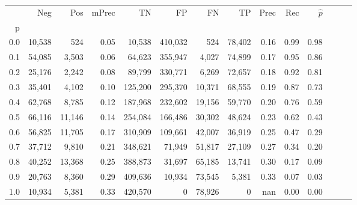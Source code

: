 \begin{tabular}{rrrrrrrrrrrrrr}
\toprule
{} &     Neg &     Pos & mPrec &       TN &       FP &      FN &      TP &  Prec &   Rec & $\hat{p}$ \\
p   &         &         &       &          &          &         &         &       &       &           \\
\midrule
0.0 &  10,538 &     524 &  0.05 &   10,538 &  410,032 &     524 &  78,402 &  0.16 &  0.99 &      0.98 \\
0.1 &  54,085 &   3,503 &  0.06 &   64,623 &  355,947 &   4,027 &  74,899 &  0.17 &  0.95 &      0.86 \\
0.2 &  25,176 &   2,242 &  0.08 &   89,799 &  330,771 &   6,269 &  72,657 &  0.18 &  0.92 &      0.81 \\
0.3 &  35,401 &   4,102 &  0.10 &  125,200 &  295,370 &  10,371 &  68,555 &  0.19 &  0.87 &      0.73 \\
0.4 &  62,768 &   8,785 &  0.12 &  187,968 &  232,602 &  19,156 &  59,770 &  0.20 &  0.76 &      0.59 \\
0.5 &  66,116 &  11,146 &  0.14 &  254,084 &  166,486 &  30,302 &  48,624 &  0.23 &  0.62 &      0.43 \\
0.6 &  56,825 &  11,705 &  0.17 &  310,909 &  109,661 &  42,007 &  36,919 &  0.25 &  0.47 &      0.29 \\
0.7 &  37,712 &   9,810 &  0.21 &  348,621 &   71,949 &  51,817 &  27,109 &  0.27 &  0.34 &      0.20 \\
0.8 &  40,252 &  13,368 &  0.25 &  388,873 &   31,697 &  65,185 &  13,741 &  0.30 &  0.17 &      0.09 \\
0.9 &  20,763 &   8,360 &  0.29 &  409,636 &   10,934 &  73,545 &   5,381 &  0.33 &  0.07 &      0.03 \\
1.0 &  10,934 &   5,381 &  0.33 &  420,570 &        0 &  78,926 &       0 &   nan &  0.00 &      0.00 \\
\bottomrule
\end{tabular}
